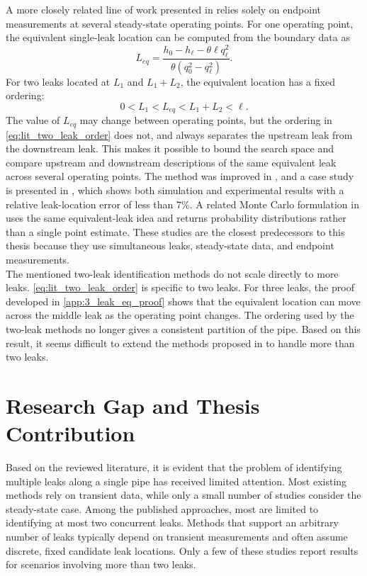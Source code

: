 A more closely related line of work presented in \cite{peralta2023} relies solely on endpoint measurements at several steady-state operating points. For one operating point, the equivalent single-leak location can be computed from the boundary data as
\begin{equation*}
L_{eq} =
\frac{h_0 - h_\ell - \theta \ell q_\ell^2}
{\theta \left(q_0^2 - q_\ell^2 \right)}.
\end{equation*}
For two leaks located at $L_1$ and $L_1+L_2$, the equivalent location has a fixed ordering:
\begin{equation}
\label{eq:lit_two_leak_order}
0 < L_1 < L_{eq} < L_1+L_2 < \ell.
\end{equation}
The value of $L_{eq}$ may change between operating points, but the ordering in \cref{eq:lit_two_leak_order} does not, and always separates the upstream leak from the downstream leak. This makes it possible to bound the search space and compare upstream and downstream descriptions of the same equivalent leak across several operating points. The method was improved in \cite{peralta2024}, and a case study is presented in \cite{peralta2025}, which shows both simulation and experimental results with a relative leak-location error of less than 7\%. A related Monte Carlo formulation in \cite{torres2024} uses the same equivalent-leak idea and returns probability distributions rather than a single point estimate. These studies are the closest predecessors to this thesis because they use simultaneous leaks, steady-state data, and endpoint measurements.\\

The mentioned two-leak identification methods do not scale directly to more leaks. \cref{eq:lit_two_leak_order} is specific to two leaks. For three leaks, the proof developed in \autoref{app:3_leak_eq_proof} shows that the equivalent location can move across the middle leak as the operating point changes. The ordering used by the two-leak methods no longer gives a consistent partition of the pipe. Based on this result, it seems difficult to extend the methods proposed in \cite{peralta2023,torres2024} to handle more than two leaks.

\section{Research Gap and Thesis Contribution}
\label{sec:lit:gap}

Based on the reviewed literature, it is evident that the problem of identifying multiple leaks along a single pipe has received limited attention. Most existing methods rely on transient data, while only a small number of studies consider the steady-state case. Among the published approaches, most are limited to identifying at most two concurrent leaks. Methods that support an arbitrary number of leaks typically depend on transient measurements and often assume discrete, fixed candidate leak locations. Only a few of these studies report results for scenarios involving more than two leaks.\\

